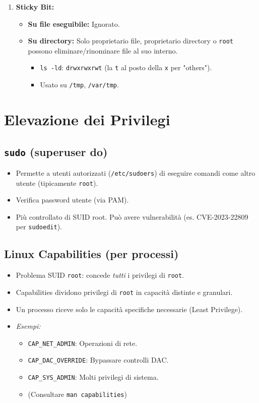 \begin{enumerate}
    \item \textbf{Sticky Bit:}
    \begin{itemize}
        \item \textbf{Su file eseguibile:} Ignorato.
        \item \textbf{Su directory:} Solo proprietario file, proprietario directory o \texttt{root} possono eliminare/rinominare file al suo interno.
        \begin{itemize}
            \item \texttt{ls -ld}: \texttt{drwxrwxrwt} (la \texttt{t} al posto della \texttt{x} per "others").
            \item Usato su \texttt{/tmp}, \texttt{/var/tmp}.
        \end{itemize}
    \end{itemize}
\end{enumerate}

\section{Elevazione dei Privilegi}
\subsection{\texttt{sudo} (superuser do)}
\begin{itemize}
    \item Permette a utenti autorizzati (\texttt{/etc/sudoers}) di eseguire comandi come altro utente (tipicamente \texttt{root}).
    \item Verifica password utente (via PAM).
    \item Più controllato di SUID root. Può avere vulnerabilità (es. CVE-2023-22809 per \texttt{sudoedit}).
\end{itemize}

\subsection{Linux Capabilities (per processi)}
\begin{itemize}
    \item Problema SUID \texttt{root}: concede \textit{tutti} i privilegi di \texttt{root}.
    \item Capabilities dividono privilegi di \texttt{root} in capacità distinte e granulari.
    \item Un processo riceve solo le capacità specifiche necessarie (Least Privilege).
    \item \textit{Esempi:}
    \begin{itemize}
        \item \texttt{CAP\_NET\_ADMIN}: Operazioni di rete.
        \item \texttt{CAP\_DAC\_OVERRIDE}: Bypassare controlli DAC.
        \item \texttt{CAP\_SYS\_ADMIN}: Molti privilegi di sistema.
        \item (Consultare \texttt{man capabilities})
    \end{itemize}
\end{itemize}

